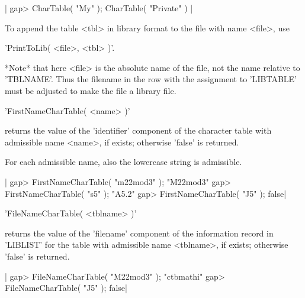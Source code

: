 |    gap> CharTable( "My" );
    CharTable( "Private" ) |

To append the table <tbl> in library format to the file with name <file>,
use

'PrintToLib( <file>, <tbl> )'.

*Note*  that here <file> is the  absolute name of  the file, not the name
relative to 'TBLNAME'.  Thus the filename in the  row with the assignment
to 'LIBTABLE' must be adjusted to make the file a library file.


'FirstNameCharTable( <name> )'

returns the  value of the 'identifier' component   of the character table
with admissible name <name>, if exists; otherwise 'false' is returned.

For each admissible name, also the lowercase string is admissible.

|    gap> FirstNameCharTable( "m22mod3" );
    "M22mod3"
    gap> FirstNameCharTable( "s5" );
    "A5.2"
    gap> FirstNameCharTable( "J5" );
    false|


'FileNameCharTable( <tblname> )'

returns  the value of the 'filename'  component of the information record
in 'LIBLIST' for the table with admissible name <tblname>, if exists;
otherwise 'false' is returned.

|    gap> FileNameCharTable( "M22mod3" );
    "ctbmathi"
    gap> FileNameCharTable( "J5" );
    false|



